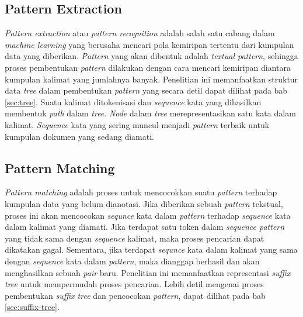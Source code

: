 \subsection{Pattern Extraction}
\textit{Pattern extraction} atau \textit{pattern recognition} adalah salah satu cabang dalam \textit{machine learning} yang berusaha mencari pola kemiripan tertentu dari kumpulan data yang diberikan. \textit{Pattern} yang akan dibentuk adalah \textit{textual pattern}, sehingga proses pembentukan \textit{pattern} dilakukan dengan cara mencari kemiripan diantara kumpulan kalimat yang jumlahnya banyak. Penelitian ini memanfaatkan struktur data \textit{tree} dalam pembentukan \textit{pattern} yang secara detil dapat dilihat pada bab \ref{sec:tree}. Suatu kalimat ditokenisasi dan \textit{sequence} kata yang dihasilkan membentuk \textit{path} dalam \textit{tree}. \textit{Node} dalam \textit{tree} merepresentasikan satu kata dalam kalimat. \textit{Sequence} kata yang sering muncul menjadi \textit{pattern} terbaik untuk kumpulan dokumen yang sedang diamati. 

\subsection{Pattern Matching}
\textit{Pattern matching} adalah proses untuk mencocokkan suatu \textit{pattern} terhadap kumpulan data yang belum dianotasi. Jika diberikan sebuah \textit{pattern} tekstual, proses ini akan mencocokan \textit{sequnce} kata dalam \textit{pattern} terhadap \textit{sequence} kata dalam kalimat yang diamati. Jika terdapat satu token dalam \textit{sequence pattern} yang tidak sama dengan \textit{sequence} kalimat, maka proses pencarian dapat dikatakan gagal. Sementara, jika terdapat \textit{sequnce} kata dalam kalimat yang sama dengan \textit{sequence} kata dalam \textit{pattern}, maka dianggap berhasil dan akan menghasilkan sebuah \textit{pair} baru. Penelitian ini memanfaatkan representasi \textit{suffix tree} untuk mempermudah proses pencarian. Lebih detil mengenai proses pembentukan \textit{suffix tree} dan pencocokan \textit{pattern}, dapat dilihat pada bab \ref{sec:suffix-tree}.


